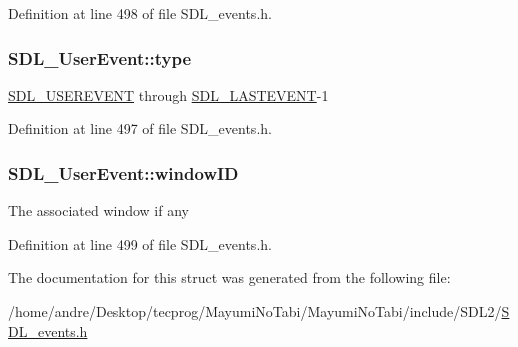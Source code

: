 Definition at line 498 of file S\-D\-L\-\_\-events.\-h.

\hypertarget{struct_s_d_l___user_event_ab7afa8b98dbd7b52bef41155e10f7340}{
\subsubsection[{type}]{ S\-D\-L\-\_\-\-User\-Event\-::type}}\label{struct_s_d_l___user_event_ab7afa8b98dbd7b52bef41155e10f7340}
\hyperlink{_s_d_l__events_8h_a3b589e89be6b35c02e0dd34a55f3fccaa4364c23f54802309e83fdb9b1c07c719}{S\-D\-L\-\_\-\-U\-S\-E\-R\-E\-V\-E\-N\-T} through \hyperlink{_s_d_l__events_8h_a3b589e89be6b35c02e0dd34a55f3fccaaffeac40a4ff366717c0ebc74118ea2ae}{S\-D\-L\-\_\-\-L\-A\-S\-T\-E\-V\-E\-N\-T}-\/1 

Definition at line 497 of file S\-D\-L\-\_\-events.\-h.

\hypertarget{struct_s_d_l___user_event_abccefa10e0e0e3a0801bc6d836a08da7}{
\subsubsection[{window\-I\-D}]{ S\-D\-L\-\_\-\-User\-Event\-::window\-I\-D}}\label{struct_s_d_l___user_event_abccefa10e0e0e3a0801bc6d836a08da7}
The associated window if any 

Definition at line 499 of file S\-D\-L\-\_\-events.\-h.



The documentation for this struct was generated from the following file\-:\begin{DoxyCompactItemize}
\item 
/home/andre/\-Desktop/tecprog/\-Mayumi\-No\-Tabi/\-Mayumi\-No\-Tabi/include/\-S\-D\-L2/\hyperlink{_s_d_l__events_8h}{S\-D\-L\-\_\-events.\-h}\end{DoxyCompactItemize}
